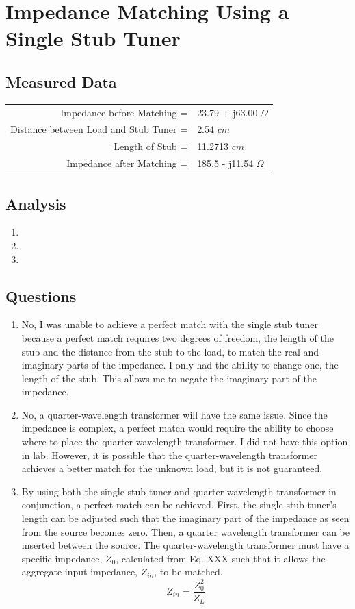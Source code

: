 \documentclass{article}
\begin{document}
\section{Impedance Matching Using a Single Stub Tuner}
\subsection{Measured Data}
\begin{table}[H]
\centering
	\begin{tabular}{rl}
	Impedance before Matching =   			 & 23.79 + j63.00 $\Omega$  \\
	Distance between Load and Stub Tuner =   & 2.54 $cm$  \\
	Length of Stub =   						 & 11.2713 $cm$  \\
	Impedance after Matching =  			 & 185.5 - j11.54 $\Omega$      
	\end{tabular}
\end{table}
\subsection{Analysis}
\begin{enumerate}
	\item
	\item
	\item
\end{enumerate}
\subsection{Questions}
\begin{enumerate}
	\item No, I was unable to achieve a perfect match with the single stub tuner because a perfect match requires two degrees of freedom, the length of the stub and the distance from the stub to the load, to match the real and imaginary parts of the impedance. I only had the ability to change one, the length of the stub. This allows me to negate the imaginary part of the impedance.
	\item No, a quarter-wavelength transformer will have the same issue. Since the impedance is complex, a perfect match would require the ability to choose where to place the quarter-wavelength transformer. I did not have this option in lab. However, it is possible that the quarter-wavelength transformer achieves a better match for the unknown load, but it is not guaranteed.
	\item By using both the single stub tuner and quarter-wavelength transformer in conjunction, a perfect match can be achieved. First, the single stub tuner's length can be adjusted such that the imaginary part of the impedance as seen from the source becomes zero. Then, a quarter wavelength transformer can be inserted between the source. The quarter-wavelength transformer must have a specific impedance, $Z_0$, calculated from Eq. XXX such that it allows the aggregate input impedance, $Z_{in}$, to be matched.
	\begin{equation}
		Z_{in} = \dfrac{Z_0^2}{Z_L}
	\end{equation}
\end{enumerate}
\end{document}
